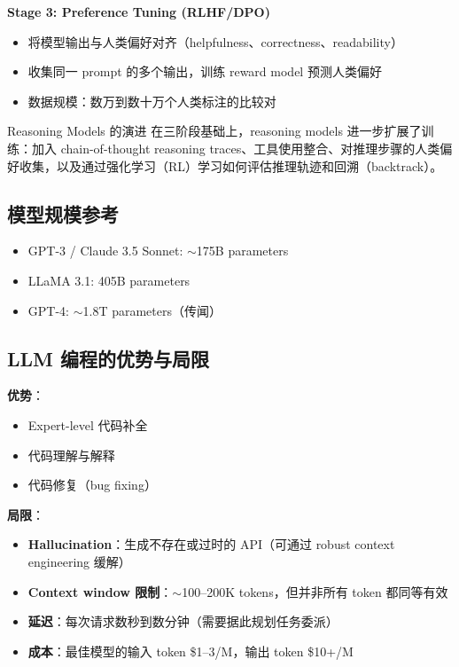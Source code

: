 \textbf{Stage 3: Preference Tuning (RLHF/DPO)}
\begin{itemize}
    \item 将模型输出与人类偏好对齐（helpfulness、correctness、readability）
    \item 收集同一 prompt 的多个输出，训练 reward model 预测人类偏好
    \item 数据规模：数万到数十万个人类标注的比较对
\end{itemize}

\begin{importantbox}{Reasoning Models 的演进}
在三阶段基础上，reasoning models 进一步扩展了训练：加入 chain-of-thought reasoning traces、工具使用整合、对推理步骤的人类偏好收集，以及通过强化学习（RL）学习如何评估推理轨迹和回溯（backtrack）。
\end{importantbox}

\subsection{模型规模参考}

\begin{itemize}
    \item GPT-3 / Claude 3.5 Sonnet: $\sim$175B parameters
    \item LLaMA 3.1: 405B parameters
    \item GPT-4: $\sim$1.8T parameters（传闻）
\end{itemize}

\subsection{LLM 编程的优势与局限}

\textbf{优势}：
\begin{itemize}
    \item Expert-level 代码补全
    \item 代码理解与解释
    \item 代码修复（bug fixing）
\end{itemize}

\textbf{局限}：
\begin{itemize}
    \item \textbf{Hallucination}：生成不存在或过时的 API（可通过 robust context engineering 缓解）
    \item \textbf{Context window 限制}：$\sim$100--200K tokens，但并非所有 token 都同等有效
    \item \textbf{延迟}：每次请求数秒到数分钟（需要据此规划任务委派）
    \item \textbf{成本}：最佳模型的输入 token \$1--3/M，输出 token \$10+/M
\end{itemize}

